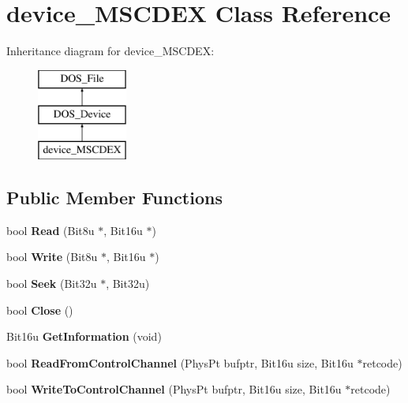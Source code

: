 \hypertarget{classdevice__MSCDEX}{\section{device\-\_\-\-M\-S\-C\-D\-E\-X Class Reference}
\label{classdevice__MSCDEX}
}
Inheritance diagram for device\-\_\-\-M\-S\-C\-D\-E\-X\-:\begin{figure}[H]
\begin{center}
\leavevmode
\includegraphics[height=3.000000cm]{classdevice__MSCDEX}
\end{center}
\end{figure}
\subsection*{Public Member Functions}
\begin{DoxyCompactItemize}
\item 
\hypertarget{classdevice__MSCDEX_a040e9958dfe8006f4db405f7054cbc80}{bool {\bfseries Read} (Bit8u $\ast$, Bit16u $\ast$)}\label{classdevice__MSCDEX_a040e9958dfe8006f4db405f7054cbc80}

\item 
\hypertarget{classdevice__MSCDEX_afb2df9c21019a276a5b4b44b14a26720}{bool {\bfseries Write} (Bit8u $\ast$, Bit16u $\ast$)}\label{classdevice__MSCDEX_afb2df9c21019a276a5b4b44b14a26720}

\item 
\hypertarget{classdevice__MSCDEX_a5d079fd4f68950089005e9bd4baf4443}{bool {\bfseries Seek} (Bit32u $\ast$, Bit32u)}\label{classdevice__MSCDEX_a5d079fd4f68950089005e9bd4baf4443}

\item 
\hypertarget{classdevice__MSCDEX_a8cd5c384e7228e66c22096688fc32f9a}{bool {\bfseries Close} ()}\label{classdevice__MSCDEX_a8cd5c384e7228e66c22096688fc32f9a}

\item 
\hypertarget{classdevice__MSCDEX_afe06caa1a1cf0cd5d9ac729a01d8d15f}{Bit16u {\bfseries Get\-Information} (void)}\label{classdevice__MSCDEX_afe06caa1a1cf0cd5d9ac729a01d8d15f}

\item 
\hypertarget{classdevice__MSCDEX_ac43fd2bd4529e0c8040a5ee56a9a855b}{bool {\bfseries Read\-From\-Control\-Channel} (Phys\-Pt bufptr, Bit16u size, Bit16u $\ast$retcode)}\label{classdevice__MSCDEX_ac43fd2bd4529e0c8040a5ee56a9a855b}

\item 
\hypertarget{classdevice__MSCDEX_a6ce13a07ecc864730388a972a20e9d81}{bool {\bfseries Write\-To\-Control\-Channel} (Phys\-Pt bufptr, Bit16u size, Bit16u $\ast$retcode)}\label{classdevice__MSCDEX_a6ce13a07ecc864730388a972a20e9d81}

\end{DoxyCompactItemize}


